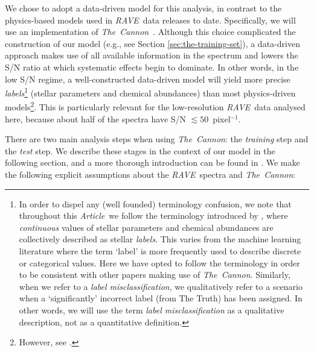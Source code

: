 \documentclass[preprint]{aastex}
\newcommand{\acronym}[1]{{\small{#1}}}
\newcommand{\article}{\emph{Article}}
\newcommand{\project}[1]{\textsl{#1}}
\newcommand{\thecannon}{\project{The~Cannon}}
\newcommand{\rave}{\project{\acronym{RAVE}}}
\begin{document}
We chose to adopt a data-driven model for this analysis, in contrast to the
physics-based models used in \rave\ data releases to date.  Specifically, we will
use an implementation of \thecannon\ \citep{Ness_2015,Ness_2016}.  Although this 
choice complicated the construction of our model (e.g., see Section 
\ref{sec:the-training-set}), a data-driven approach makes use of all available 
information in the spectrum and lowers the S/N ratio at which systematic effects 
begin to dominate.  In other words, in the low S/N regime, a well-constructed 
data-driven model will yield more precise \emph{labels}\footnote{In order to 
dispel any (well founded) terminology confusion, we note that throughout this
\article\ we follow the terminology introduced by \citet{Ness_2015}, where 
\emph{continuous} values of stellar parameters and chemical abundances are 
collectively described as stellar \emph{labels}. This varies from the machine 
learning literature where the term `label' is more frequently used to describe
discrete or categorical values. Here we have opted to follow the \citet{Ness_2015} 
terminology in order to be consistent with other papers making use of \thecannon.
Similarly, when we refer to a \emph{label misclassification}, we qualitatively
refer to a scenario when a `significantly' incorrect label (from The Truth) has
been assigned. In other words, we will use the term \emph{label misclassification}
as a qualitative description, not as a quantitative definition.}
(stellar parameters and chemical abundances) than most physics-driven 
models\footnote{However, see \citet{Casey_2016a}.}.  This is particularly relevant 
for the low-resolution \rave\ data analysed here, because about half of the 
spectra have S/N $\lesssim 50$~pixel$^{-1}$.


There are two main analysis steps when using \thecannon: the \emph{training} 
step and the \emph{test} step.  We describe these stages in the context of our
model in the following section, and a more thorough introduction can be found
in \citet{Ness_2015}.  We make the following explicit assumptions about the 
\rave\ spectra and \thecannon:
\end{document}
